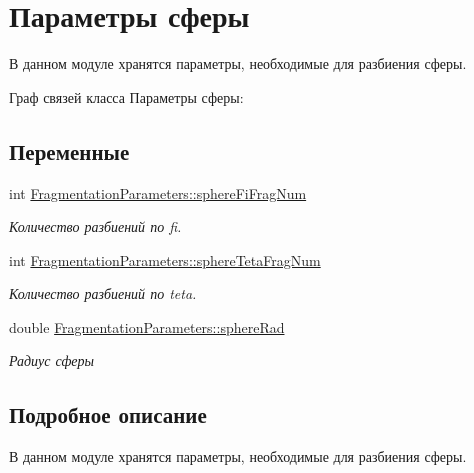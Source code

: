 \hypertarget{group__sphere_parameters}{}\section{Параметры сферы}
\label{group__sphere_parameters}


В данном модуле хранятся параметры, необходимые для разбиения сферы.  


Граф связей класса Параметры сферы\+:
\subsection*{Переменные}
\begin{DoxyCompactItemize}
\item 
\mbox{\label{group__sphere_parameters_ga713cc6115dea245daace4ad636a6c372}} 
int \mbox{\hyperlink{group__sphere_parameters_ga713cc6115dea245daace4ad636a6c372}{Fragmentation\+Parameters\+::sphere\+Fi\+Frag\+Num}}
\begin{DoxyCompactList}\small\item\em Количество разбиений по fi. \end{DoxyCompactList}\item 
\mbox{\label{group__sphere_parameters_ga3b84127629eca0061dd4580b9c58fb2c}} 
int \mbox{\hyperlink{group__sphere_parameters_ga3b84127629eca0061dd4580b9c58fb2c}{Fragmentation\+Parameters\+::sphere\+Teta\+Frag\+Num}}
\begin{DoxyCompactList}\small\item\em Количество разбиений по teta. \end{DoxyCompactList}\item 
\mbox{\label{group__sphere_parameters_ga047538aed251173849c36520efbe8225}} 
double \mbox{\hyperlink{group__sphere_parameters_ga047538aed251173849c36520efbe8225}{Fragmentation\+Parameters\+::sphere\+Rad}}
\begin{DoxyCompactList}\small\item\em Радиус сферы \end{DoxyCompactList}\end{DoxyCompactItemize}


\subsection{Подробное описание}
В данном модуле хранятся параметры, необходимые для разбиения сферы. 

